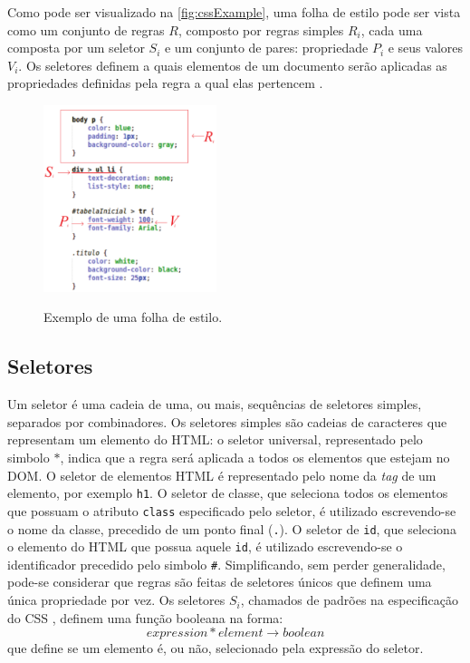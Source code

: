 Como pode ser visualizado na \autoref{fig:cssExample}, uma folha de estilo pode ser vista como um conjunto de regras \(R\), composto por regras simples \(R_i\), cada uma composta por um seletor \(S_i\) e um conjunto de pares: propriedade \(P_i\) e seus valores \(V_i\). Os seletores definem a quais elementos de um documento serão aplicadas as propriedades definidas pela regra a qual elas pertencem \cite{Geneves2012}.

\begin{figure}[!htb]
	\centering
	\caption{Exemplo de uma folha de estilo.}
	\includegraphics[width=0.45\textwidth]{./04-figuras/css_example_marked}
	\label{fig:cssExample}
\end{figure}

\subsection{Seletores}
\label{subsec:seletores}

Um seletor é uma cadeia de uma, ou mais, sequências de seletores simples, separados por combinadores. Os seletores simples são cadeias de caracteres que representam um elemento do HTML: o seletor universal, representado pelo simbolo \(\ast\), indica que a regra será aplicada a todos os elementos que estejam no DOM. O seletor de elementos HTML é representado pelo nome da \textit{tag} de um elemento, por exemplo \texttt{h1}. O seletor de classe, que seleciona todos os elementos que possuam o atributo \texttt{class} especificado pelo seletor, é utilizado escrevendo-se o nome da classe,  precedido de um ponto final (\texttt{.}). O seletor de \texttt{id}, que seleciona o elemento do HTML que possua aquele \texttt{id}, é utilizado escrevendo-se o identificador precedido pelo simbolo \texttt{\#}. 
Simplificando, sem perder generalidade, pode-se considerar que regras são feitas de seletores únicos que definem uma única propriedade por vez. Os seletores \(S_i\), chamados de padrões na especificação do CSS \cite{CSSspec2009}, definem uma função booleana na forma:
\begin{equation}
	expression * element \rightarrow boolean
\end{equation}
que define se um elemento é, ou não, selecionado pela expressão do seletor.

